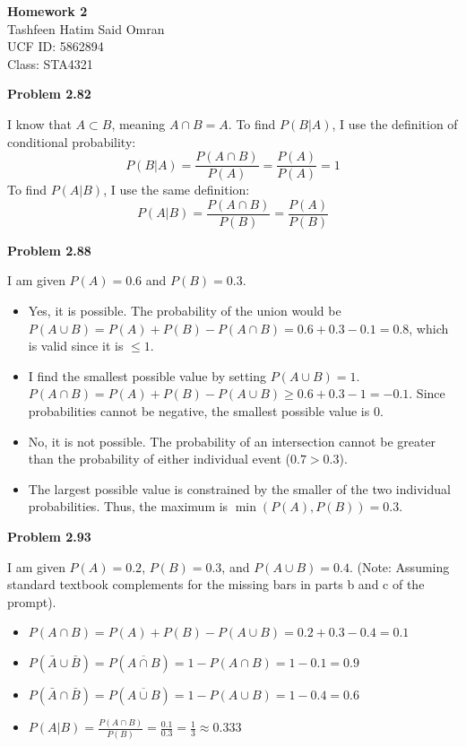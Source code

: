 \documentclass[11pt]{article}
\begin{document}
\begin{center}
    \textbf{\Large Homework 2}\\
    \vspace{0.2cm}
    Tashfeen Hatim Said Omran\\
    UCF ID: 5862894\\
    Class: STA4321
\end{center}

\vspace{0.5cm}

\textbf{\large Problem 2.82}

I know that $A \subset B$, meaning $A \cap B = A$. 
To find $P(B|A)$, I use the definition of conditional probability:
\[
P(B|A) = \frac{P(A \cap B)}{P(A)} = \frac{P(A)}{P(A)} = 1
\]
To find $P(A|B)$, I use the same definition:
\[
P(A|B) = \frac{P(A \cap B)}{P(B)} = \frac{P(A)}{P(B)}
\]

\textbf{\large Problem 2.88}

I am given $P(A) = 0.6$ and $P(B) = 0.3$.
\begin{itemize}
    \item[\textbf{a)}] Yes, it is possible. The probability of the union would be $P(A \cup B) = P(A) + P(B) - P(A \cap B) = 0.6 + 0.3 - 0.1 = 0.8$, which is valid since it is $\le 1$.
    \item[\textbf{b)}] I find the smallest possible value by setting $P(A \cup B) = 1$. $P(A \cap B) = P(A) + P(B) - P(A \cup B) \ge 0.6 + 0.3 - 1 = -0.1$. Since probabilities cannot be negative, the smallest possible value is $0$.
    \item[\textbf{c)}] No, it is not possible. The probability of an intersection cannot be greater than the probability of either individual event ($0.7 > 0.3$).
    \item[\textbf{d)}] The largest possible value is constrained by the smaller of the two individual probabilities. Thus, the maximum is $\min(P(A), P(B)) = 0.3$.
\end{itemize}

\textbf{\large Problem 2.93}

I am given $P(A) = 0.2$, $P(B) = 0.3$, and $P(A \cup B) = 0.4$. (Note: Assuming standard textbook complements for the missing bars in parts b and c of the prompt).
\begin{itemize}
    \item[\textbf{a)}] $P(A \cap B) = P(A) + P(B) - P(A \cup B) = 0.2 + 0.3 - 0.4 = 0.1$
    \item[\textbf{b)}] $P(\bar{A} \cup \bar{B}) = P(\overline{A \cap B}) = 1 - P(A \cap B) = 1 - 0.1 = 0.9$
    \item[\textbf{c)}] $P(\bar{A} \cap \bar{B}) = P(\overline{A \cup B}) = 1 - P(A \cup B) = 1 - 0.4 = 0.6$
    \item[\textbf{d)}] $P(A|B) = \frac{P(A \cap B)}{P(B)} = \frac{0.1}{0.3} = \frac{1}{3} \approx 0.333$
\end{itemize}
\end{document}
